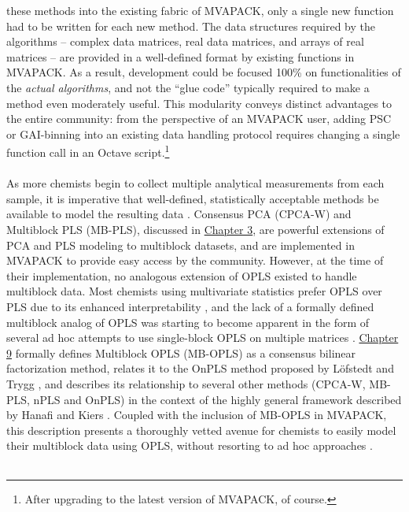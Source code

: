 \begin{doublespace}
these methods into the existing fabric of MVAPACK, only a single new
function had to be written for each new method. The data structures
required by the algorithms -- complex data matrices, real data matrices,
and arrays of real matrices -- are provided in a well-defined format by
existing functions in MVAPACK. As a result, development could be focused
100\% on functionalities of the \emph{actual algorithms}, and not the
``glue code'' typically required to make a method even moderately useful.
This modularity conveys distinct advantages to the entire community:
from the perspective of an MVAPACK user, adding PSC or GAI-binning into
an existing data handling protocol requires changing a single function
call in an Octave script.\footnote{After upgrading to the latest version
of MVAPACK, of course.}
\\\\
As more chemists begin to collect multiple analytical measurements from each
sample, it is imperative that well-defined, statistically acceptable methods
be available to model the resulting data \cite{westerhuis:jchemo1997,
  westerhuis:jchemo1998,smilde:jchemo2003,
  marshall:metab2015,worley:cils2015b}. Consensus PCA (CPCA-W) and Multiblock
PLS (MB-PLS), discussed in \hyperlink{chapter.3}{Chapter 3}, are powerful
extensions of PCA and PLS modeling to multiblock datasets, and are implemented
in MVAPACK to provide easy access by the community. However, at the time of
their implementation, no analogous extension of OPLS existed to handle
multiblock data. Most chemists using multivariate statistics prefer OPLS
over PLS due to its enhanced
interpretability \cite{trygg:jchemo2002,tapp:trac2009}, and the lack of
a formally defined multiblock analog of OPLS was starting to become apparent
in the form of several ad hoc attempts to use single-block OPLS on multiple
matrices \cite{bylesjo:jpr2009,boccard:aca2013}.
\hyperlink{chapter.9}{Chapter 9} formally defines Multiblock OPLS (MB-OPLS)
as a consensus bilinear factorization method, relates it to the OnPLS method
proposed by L\"{o}fstedt and Trygg \cite{lofstedt:jchemo2011}, and describes
its relationship to several other methods (CPCA-W, MB-PLS, nPLS and OnPLS)
in the context of the highly general framework described by Hanafi and Kiers
\cite{hanafi:csda2006}. Coupled with the inclusion of MB-OPLS in MVAPACK,
this description presents a thoroughly vetted avenue for chemists to easily
model their multiblock data using OPLS, without resorting to ad hoc
approaches \cite{worley:cils2015b}.
\\\\

\end{doublespace}
